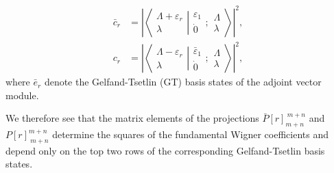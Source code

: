 \documentclass[12pt]{article}
\def\nn{\nonumber}
\begin{document}
\begin{align}
\bar{c}_r  &= \left| \left\langle\left. 
\begin{array}{c} \Lambda+\varepsilon_r\\ \lambda \end{array}
\right|\right.
\left.
\begin{array}{c} \varepsilon_1 \\
\dot{0} \end{array} 
;
 \begin{array}{c} \Lambda \\
\lambda \end{array}
\right\rangle \right|^2, \nn\\
c_r &= \left| \left\langle\left. 
\begin{array}{c} \Lambda-\varepsilon_r\\ \lambda \end{array}
\right|\right.
\left.
\begin{array}{c} \bar{\varepsilon}_1 \\
\dot{0} \end{array}  ; \begin{array}{c} \Lambda \\
\lambda \end{array}
\right\rangle \right|^2, \label{WigCoefCs}
\end{align}
where $\bar{e}_r$ denote the Gelfand-Tsetlin (GT) basis states of the adjoint vector module.

We therefore see that the matrix elements of the projections $\bar{P}[r]_{m+n}^{\ m+n}$ and $P[r]_{\ m+n}^{m+n}$ determine
the squares of the fundamental Wigner coefficients and depend only on the top two rows of the corresponding Gelfand-Tsetlin basis states.

\end{document}
